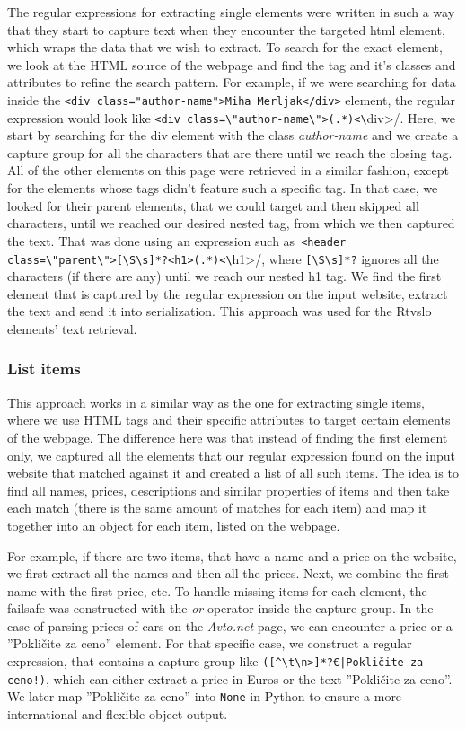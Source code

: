 \documentclass[9pt]{IEEEtran}
\begin{document}
The regular expressions for extracting single elements were written in such a way that they start to capture text when they encounter the targeted html element, which wraps the data that we wish to extract. To search for the exact element, we look at the HTML source of the webpage and find the tag and it's classes and attributes to refine the search pattern. For example, if we were searching for data inside the \texttt{<div class="author-name">Miha Merljak</div>} element, the regular expression would look like \verb/<div class=\"author-name\">(.*)<\/div>/. Here, we start by searching for the div element with the class \textit{author-name} and we create a capture group for all the characters that are there until we reach the closing tag. All of the other elements on this page were retrieved in a similar fashion, except for the elements whose tags didn't feature such a specific tag. In that case, we looked for their parent elements, that we could target and then skipped all characters, until we reached our desired nested tag, from which we then captured the text. That was done using an expression such as~\verb/<header class=\"parent\">[\S\s]*?<h1>(.*)<\/h1>/, where \verb/[\S\s]*?/ ignores all the characters (if there are any) until we reach our nested h1 tag. We find the first element that is captured by the regular expression on the input website, extract the text and send it into serialization. This approach was used for the Rtvslo elements' text retrieval.

\subsubsection{List items}

This approach works in a similar way as the one for extracting single items, where we use HTML tags and their specific attributes to target certain elements of the webpage. The difference here was that instead of finding the first element only, we captured all the elements that our regular expression found on the input website that matched against it and created a list of all such items.
The idea is to find all names, prices, descriptions and similar properties of items and then take each match (there is the same amount of matches for each item) and map it together into an object for each item, listed on the webpage.

For example, if there are two items, that have a name and a price on the website, we first extract all the names and then all the prices. Next, we combine the first name with the first price, etc. To handle missing items for each element, the failsafe was constructed with the \textit{or} operator inside the capture group. In the case of parsing prices of cars on the \textit{Avto.net} page, we can encounter a price or a ''Pokličite za ceno'' element. For that specific case, we construct a regular expression, that contains a capture group like \verb/([^\t\n>]*?€|Pokličite za ceno!)/, which can either extract a price in Euros or the text ''Pokličite za ceno''. We later map ''Pokličite za ceno'' into \texttt{None} in Python to ensure a more international and flexible object output.
\end{document}
